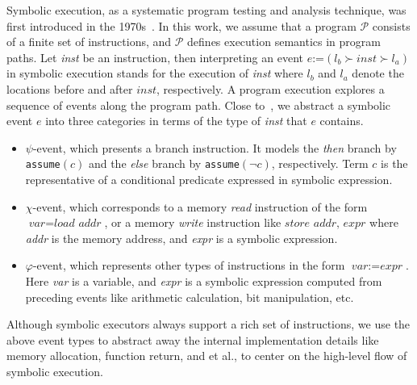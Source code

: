 \documentclass[sigconf,screen]{acmart}
\newcommand{\textcode}[1]{\texttt{#1}}
\newcommand{\prog}{\mathcal{P}}
\begin{document}
Symbolic execution, as a systematic program testing and analysis technique, 
was first introduced in the 1970s~\cite{King76,Clarke76}. In this work, we 
assume that a program $\prog$ consists of a finite set of instructions, and 
$\prog$ defines execution semantics in program paths. Let \textit{inst} be 
an instruction, then interpreting an event $e$:=$(l_b\succ inst\succ l_a)$ 
in symbolic execution stands for the execution of \textit{inst} where $l_b$ 
and $l_a$ denote the locations before and after $inst$, respectively. A 
program execution explores a sequence of events along the program path. 
Close to~\cite{GuoKWYG15,GuoWW18}, we abstract a symbolic event $e$ into 
three categories in terms of the type of \textit{inst} that $e$ contains.


\begin{itemize}
  \item $\psi$-event, which presents a branch instruction. It models the 
    \textit{then} branch by \textcode{assume$(c)$} and the \textit{else} 
    branch by \textcode{assume$(\neg c)$}, respectively. Term $\textit{c}$ 
    is the representative of a conditional predicate expressed in symbolic 
    expression. 

  \item $\chi$-event, which corresponds to a memory \textit{read} instruction 
    of the form $\textit{var}=\textit{load~addr}$, or a memory \textit{write} 
    instruction like $\textit{store~addr, expr}$ where \textit{addr} is the 
    memory address, and \textit{expr} is a symbolic expression.

  \item $\varphi$-event, which represents other types of instructions in the 
    form $\textit{var}:=\textit{expr}$. Here \textit{var} is a variable, and 
    \textit{expr} is a symbolic expression computed from preceding events like 
    arithmetic calculation, bit manipulation, etc.
\end{itemize}


Although symbolic executors always support a rich set of instructions, we use 
the above event types to abstract away the internal implementation details like 
memory allocation, function return, and et al., to center on the high-level flow 
of symbolic execution.
\end{document}
